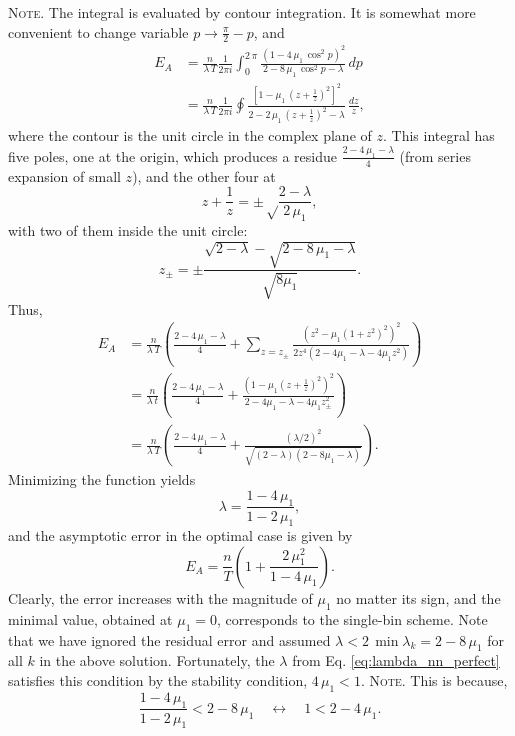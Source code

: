 \documentclass[reprint, floatfix]{revtex4-1}
\newcommand{\note}[1]{{\color{DarkGreen}\footnotesize \textsc{Note.} #1}}
\newcommand{\Err}{E}
\begin{document}
\note{The integral is evaluated by contour integration.
%
It is somewhat more convenient to change variable $p \to \frac{ \pi } { 2 } - p$,
and
$$
\begin{aligned}
\Err_A
&=
\frac{n}{\lambda \, T}
\frac{1}{2 \pi i}
\int_0^{2 \, \pi}
\frac{ \left(1 - 4 \, \mu_1 \, \cos^2 p \right)^2 }
{ 2 - 8 \, \mu_1 \, \cos^2 p - \lambda }
\, dp
\\
&=
\frac{n}{\lambda \, T}
\frac{1}{2 \pi i}
\oint
\frac{ \left[1 - \mu_1 \, \left(z+\frac{1}{z}\right)^2 \right]^2 }
{ 2 - 2 \, \mu_1 \, \left(z + \frac{1}{z}\right)^2 - \lambda }
\, \frac{dz}{z},
\end{aligned}
$$
where the contour is the unit circle
in the complex plane of $z$.
%
This integral has five poles, one at the origin,
which produces a residue
$\frac{2 - 4 \, \mu_1 - \lambda}{4}$
(from series expansion of small $z$),
and the other four at
$$
z + \frac{1}{z} = \pm\sqrt\frac{2-\lambda}{2 \, \mu_1},
$$
with two of them inside the unit circle:
$$
z_\pm = \pm \frac{\sqrt{2-\lambda} -\sqrt{2 - 8 \, \mu_1 - \lambda}}
{\sqrt{8 \mu_1}}.
$$
Thus,
$$
\begin{aligned}
\Err_A
&=
\frac{      n       }
     { \lambda \, T }
\left(
 \frac{ 2 - 4 \, \mu_1 - \lambda }
      {          4               }
 +
 \sum_{z = z_{\pm} }
 \frac{ \left(z^2 - \mu_1 (1 + z^2)^2 \right)^2 }
 { 2 z^4 (2 - 4 \mu_1 - \lambda - 4 \mu_1 z^2) }
\right)
\\
&=
\frac{       n      }
     { \lambda \, t }
\left(
  \frac{ 2 - 4 \, \mu_1 - \lambda }
       {          4               }
 +
 \frac{ \left(1 - \mu_1 \left(z + \frac{1}{z} \right)^2 \right)^2 }
      { 2 - 4 \mu_1 - \lambda - 4 \mu_1 z_{\pm}^2                 }
\right)
\\
&=
\frac{       n      }
     { \lambda \, T }
\left(
  \frac{ 2 - 4 \, \mu_1 - \lambda }
       {          4               }
 +
 \frac{ (\lambda/2)^2 }
 { \sqrt{(2-\lambda) (2 - 8 \mu_1 -\lambda)} }
\right).
\end{aligned}
$$
}
%
Minimizing the function yields
%
\begin{equation}
\lambda = \frac{1 - 4 \, \mu_1} { 1 - 2 \, \mu_1 },
\label{eq:lambda_nn_perfect}
\end{equation}
%
and the asymptotic error in the optimal case is given by
%
\begin{equation}
\Err_A
=
\frac{n}{T}
\left(
  1+ \frac{2 \, \mu_1^2}{1-4 \, \mu_1}
\right).
\label{eq:error_nn_prefect}
\end{equation}
%
Clearly, the error
increases with the magnitude of $\mu_1$
no matter its sign,
and the minimal value, obtained at $\mu_1 = 0$,
corresponds to the single-bin scheme.
%
Note that we have ignored the residual error
and assumed $\lambda < 2 \, \min \lambda_k = 2 - 8 \, \mu_1$
for all $k$ in the above solution.
%
Fortunately,
the $\lambda$ from Eq. \eqref{eq:lambda_nn_perfect}
satisfies this condition
by the stability condition,
$4 \, \mu_1 < 1$.
\note{This is because,
$$
\frac{ 1 - 4 \, \mu_1 } { 1 - 2 \, \mu_1 } < 2 - 8 \, \mu_1
\quad \leftrightarrow \quad
1 < 2 - 4 \, \mu_1.
$$
}
\end{document}
